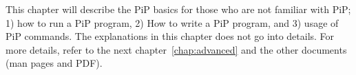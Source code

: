 
This chapter will describe the PiP basics for those who are not
familiar with PiP; 1) how to run a PiP program, 2) How to write a PiP
program, and 3) usage of PiP commands. The explanations in this
chapter does not go into details. For more details, refer to the next
chapter~\ref{chap:advanced} and the other documents (man pages and
PDF). 
